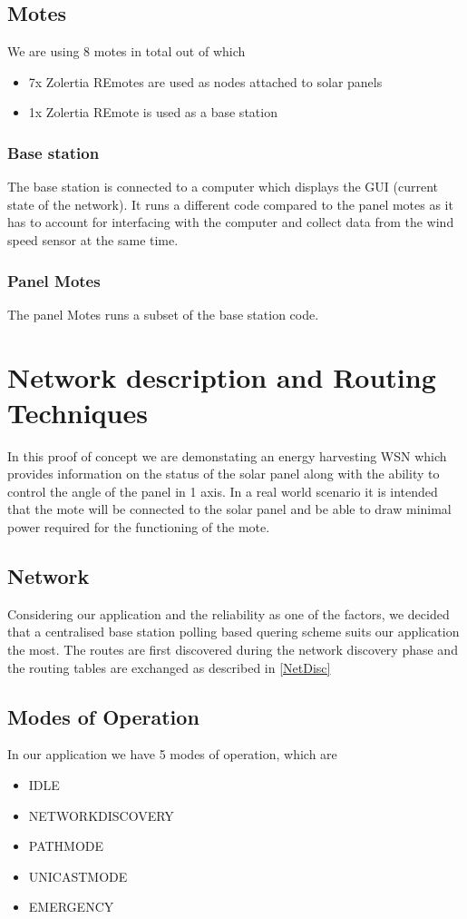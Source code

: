 \documentclass[conference]{IEEEtran}
\begin{document}
\subsection{Motes}
We are using 8 motes in total out of which
\begin{itemize}
    \item 7x Zolertia REmotes are used as nodes attached to solar panels
    \item 1x Zolertia REmote is used as a base station
\end{itemize}

\subsubsection{Base station}
    The base station is connected to a computer which displays the GUI (current state of the network). It runs a different code compared to the panel motes as it has to account for interfacing with the computer and collect data from the wind speed sensor at the same time.
\subsubsection{Panel Motes}
    The panel Motes runs a subset of the base station code.

\section{Network description and Routing Techniques}
In this proof of concept we are demonstating an energy harvesting WSN which provides information on the status of the solar panel along with the ability to control the angle of the panel in 1 axis. In a real world scenario it is intended that the mote\cite{REmote} will be connected to the solar panel and be able to draw minimal power required for the functioning of the mote.
\subsection{Network}
Considering our application and the reliability as one of the factors, we decided that a centralised base station polling based quering scheme suits our application the most. The routes are first discovered during the network discovery phase and the routing tables are exchanged as described in \ref{NetDisc}

\subsection{Modes of Operation}
In our application we have 5 modes of operation, which are 
\begin{itemize}
    \item IDLE
    \item NETWORKDISCOVERY
    \item PATHMODE
    \item UNICASTMODE
    \item EMERGENCY
\end{itemize}
\end{document}
